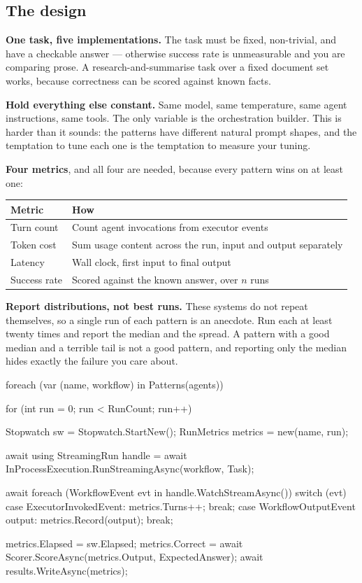 \subsection{The design}

\textbf{One task, five implementations.} The task must be fixed, non-trivial, and
have a checkable answer --- otherwise success rate is unmeasurable and you are
comparing prose. A research-and-summarise task over a fixed document set works,
because correctness can be scored against known facts.

\textbf{Hold everything else constant.} Same model, same temperature, same agent
instructions, same tools. The only variable is the orchestration builder. This is
harder than it sounds: the patterns have different natural prompt shapes, and the
temptation to tune each one is the temptation to measure your tuning.

\textbf{Four metrics}, and all four are needed, because every pattern wins on at
least one:

\begin{center}
\small
\begin{tabularx}{\linewidth}{@{}lX@{}}
\toprule
\textbf{Metric} & \textbf{How} \\
\midrule
Turn count & Count agent invocations from executor events \\
Token cost & Sum usage content across the run, input and output separately \\
Latency & Wall clock, first input to final output \\
Success rate & Scored against the known answer, over $n$ runs \\
\bottomrule
\end{tabularx}
\end{center}

\textbf{Report distributions, not best runs.} These systems do not repeat
themselves, so a single run of each pattern is an anecdote. Run each at least
twenty times and report the median and the spread. A pattern with a good median
and a terrible tail is not a good pattern, and reporting only the median hides
exactly the failure you care about.

\begin{csharp}[caption={The harness shape}, label={lst:orch-harness}]
foreach (var (name, workflow) in Patterns(agents))
{
    for (int run = 0; run < RunCount; run++)
    {
        Stopwatch sw = Stopwatch.StartNew();
        RunMetrics metrics = new(name, run);

        await using StreamingRun handle =
            await InProcessExecution.RunStreamingAsync(workflow, Task);

        await foreach (WorkflowEvent evt in handle.WatchStreamAsync())
        {
            switch (evt)
            {
                case ExecutorInvokedEvent: metrics.Turns++; break;
                case WorkflowOutputEvent output: metrics.Record(output); break;
            }
        }

        metrics.Elapsed = sw.Elapsed;
        metrics.Correct = await Scorer.ScoreAsync(metrics.Output, ExpectedAnswer);
        await results.WriteAsync(metrics);
    }
}
\end{csharp}

